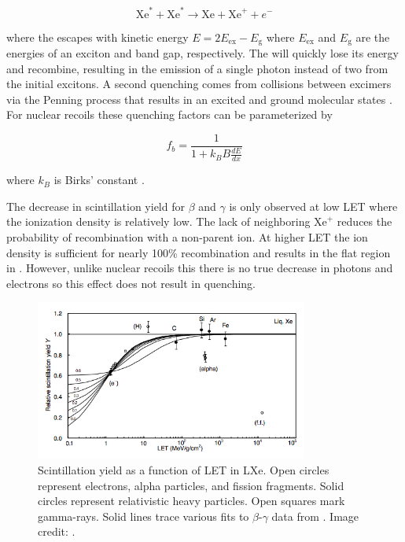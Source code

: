 \begin{equation}
\mathrm{Xe}^{*} + \mathrm{Xe}^{*} \rightarrow \mathrm{Xe} + \mathrm{Xe}^{+} + e^{-}
\label{eq:biexcitonic_again}
\end{equation}

\noindent where the \electron escapes with kinetic energy $E = 2E_{\mathrm{ex}} - E_{\mathrm{g}}$ where $E_{\mathrm{ex}}$ and
$E_{\mathrm{g}}$ are the energies of an exciton and band gap, respectively.  The \electron will quickly lose its energy and recombine,
resulting in the emission of a single photon instead of two from the initial excitons.  A second quenching comes from collisions between
excimers via the Penning process that results in an excited and ground molecular states .  For nuclear recoils these
quenching factors can be parameterized by

\begin{equation}
f_{b} = \frac{1}{1 + k_B B \frac{dE}{dx}}
\label{eq:nr_scint_quench}
\end{equation}

\noindent where $k_B$ is Birks' constant .

The decrease in scintillation yield for $\beta$ and $\gamma$ is only observed at low LET where the ionization density is relatively
low.  The
lack of neighboring $\mathrm{Xe}^{+}$ reduces the probability of recombination with a non-parent ion.  At higher LET the ion density
is sufficient for nearly 100\% recombination and results in the flat region in .  However, unlike nuclear
recoils this there is no true decrease in photons and electrons so this effect does not result in quenching.

\begin{figure}
\includegraphics[width=0.8\textwidth]{ScintillationYield}
\caption[Scintillation yield as a function of LET in LXe for electrons, alpha particles, fission fragments, relativistic heavy particles, and
$\gamma$-rays.]{Scintillation yield as a function of LET in LXe.  Open circles represent electrons, alpha particles, and fission
fragments.  Solid circles represent relativistic heavy particles.  Open squares mark gamma-rays.  Solid lines trace various fits
to $\beta$-$\gamma$ data from .  Image credit: .}
\label{fig:scintillation_yield}
\end{figure}



